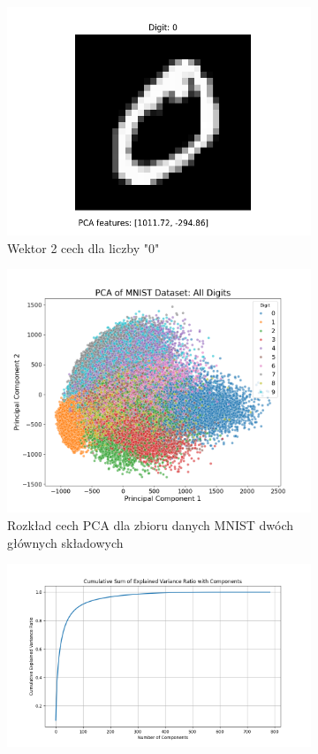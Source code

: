 \documentclass[10pt]{article}
\begin{document}
\begin{figure}[H]
\begin{subfigure}{0.16\textwidth}
        \includegraphics[width=\linewidth]{img/PCA/PCA_0}
        \caption{Wektor 2 cech dla liczby "0"}
    \end{subfigure}
    \hfill
    \begin{subfigure}{0.24\textwidth}
        \includegraphics[width=\linewidth]{img/PCA/PCA_distribution}
        \caption{Rozkład cech PCA dla zbioru danych MNIST dwóch głównych składowych}
    \end{subfigure}
    \hfill
    \begin{subfigure}{0.24\textwidth}
        \includegraphics[width=\linewidth]{img/PCA/PCA_cumulative_variance}

\end{subfigure}
\end{figure}
\end{document}
